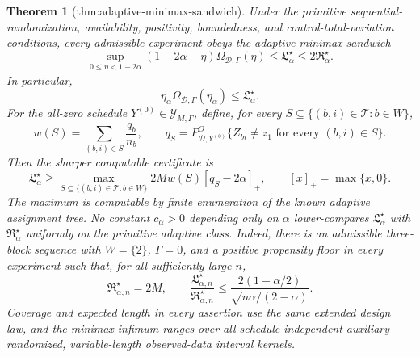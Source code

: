 \documentclass{article}
\newtheorem{theorem}{Theorem}
\begin{document}
\begin{theorem}[thm:adaptive-minimax-sandwich]\label{thm:adaptive-minimax-sandwich}
Under the primitive sequential-randomization, availability, positivity, boundedness, and control-total-variation conditions, every admissible experiment obeys the adaptive minimax sandwich
\[
 \sup_{0\le\eta<1-2\alpha}
 (1-2\alpha-\eta)\Omega_{\mathcal D,\Gamma}(\eta)
 \le \mathfrak L_\alpha^\star
 \le2\mathfrak R_\alpha^\star.
\]
In particular,
\[
 \eta_\alpha\Omega_{\mathcal D,\Gamma}(\eta_\alpha)
 \le\mathfrak L_\alpha^\star.
\]
For the all-zero schedule \(Y^{(0)}\in\mathcal Y_{M,\Gamma}\), define, for every \(S\subseteq\{(b,i)\in\mathcal T:b\in W\}\),
\[
 w(S)=\sum_{(b,i)\in S}\frac{q_b}{n_b},
 \qquad
 q_S=P^O_{\mathcal D,Y^{(0)}}\{Z_{bi}\ne z_1\text{ for every }(b,i)\in S\}.
\]
Then the sharper computable certificate is
\[
 \mathfrak L_\alpha^\star
 \ge
 \max_{S\subseteq\{(b,i)\in\mathcal T:b\in W\}}
 2Mw(S)[q_S-2\alpha]_+,
 \qquad [x]_+=\max\{x,0\}.
\]
The maximum is computable by finite enumeration of the known adaptive assignment tree.  No constant \(c_\alpha>0\) depending only on \(\alpha\) lower-compares \(\mathfrak L_\alpha^\star\) with \(\mathfrak R_\alpha^\star\) uniformly on the primitive adaptive class.  Indeed, there is an admissible three-block sequence with \(W=\{2\}\), \(\Gamma=0\), and a positive propensity floor in every experiment such that, for all sufficiently large \(n\),
\[
 \mathfrak R_{\alpha,n}^\star=2M,
 \qquad
 \frac{\mathfrak L_{\alpha,n}^\star}{\mathfrak R_{\alpha,n}^\star}
 \le
 \frac{2(1-\alpha/2)}{\sqrt{n\alpha/(2-\alpha)}}.
\]
Coverage and expected length in every assertion use the same extended design law, and the minimax infimum ranges over all schedule-independent auxiliary-randomized, variable-length observed-data interval kernels.
\end{theorem}
\end{document}
